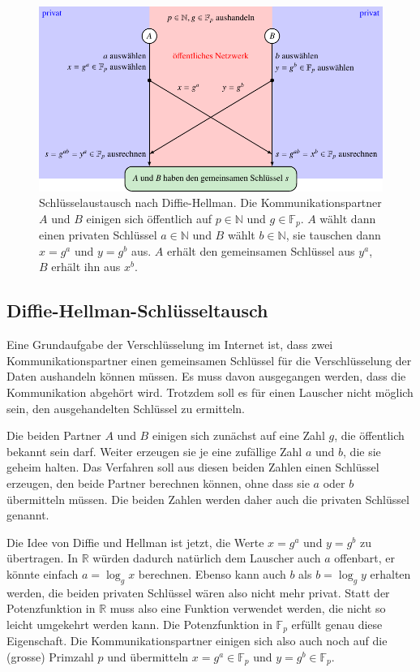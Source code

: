 \begin{figure}
\centering
\includegraphics{chapters/90-crypto/images/dh.pdf}
\caption{Schlüsselaustausch nach Diffie-Hellman.
%
%
Die Kommunikationspartner $A$ und $B$ einigen sich öffentlich auf
$p\in\mathbb{N}$ und $g\in\mathbb{F}_p$.
$A$ wählt dann einen privaten Schlüssel $a\in\mathbb{N}$ und
$B$ wählt $b\in\mathbb{N}$, sie tauschen dann $x=g^a$ und $y=g^b$
aus.
$A$ erhält den gemeinsamen Schlüssel aus $y^a$, $B$ erhält ihn
aus $x^b$.
\label{buch:crypto:fig:dh}}
\end{figure}

%
%
\subsection{Diffie-Hellman-Schlüsseltausch
\label{buch:subsection:diffie-hellman}}
Eine Grundaufgabe der Verschlüsselung im Internet ist, dass zwei
Kommunikationspartner einen gemeinsamen Schlüssel für die Verschlüsselung
der Daten aushandeln können müssen.
Es muss davon ausgegangen werden, dass die Kommunikation abgehört wird.
Trotzdem soll es für einen Lauscher nicht möglich sein, den 
ausgehandelten Schlüssel zu ermitteln.

Die beiden Partner $A$ und $B$ einigen sich zunächst auf eine Zahl $g$,
die öffentlich bekannt sein darf.
Weiter erzeugen sie je eine zufällige Zahl $a$ und $b$, die sie geheim
halten.
Das Verfahren soll aus diesen beiden Zahlen einen Schlüssel erzeugen,
den beide Partner berechnen können, ohne dass sie $a$ oder $b$ 
übermitteln müssen.
Die beiden Zahlen werden daher auch die privaten Schlüssel genannt.

Die Idee von Diffie und Hellman ist jetzt, die Werte $x=g^a$ und $y=g^b$
zu übertragen.
In $\mathbb{R}$ würden dadurch natürlich dem Lauscher auch $a$ offenbart,
er könnte einfach $a=\log_g x$ berechnen.
Ebenso kann auch $b$ als $b=\log_g y$ erhalten werden, die beiden
privaten Schlüssel wären also nicht mehr privat.
Statt der Potenzfunktion in $\mathbb{R}$ muss also eine Funktion
verwendet werden, die nicht so leicht umgekehrt werden kann.
Die Potenzfunktion in $\mathbb{F}_p$ erfüllt genau diese Eigenschaft.
Die Kommunikationspartner einigen sich also auch noch auf die (grosse)
Primzahl $p$ und übermitteln $x=g^a\in\mathbb{F}_p$ und
$y=g^b\in\mathbb{F}_p$.


